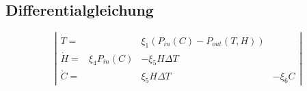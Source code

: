 \begin{refsection}
%
%
%
%
%
%
%
%
%
%

\subsection{Differentialgleichung}

\begin{equation}
\left|
\begin{matrix}
\dot{T} = &  & \xi_1 \left(P_{in}(C) - P_{out}(T, H) \right) &\\
\dot{H} = & \xi_4 P_{in}(C) & - \xi_5 H \Delta T & \\
\dot{C} = &                 &   \xi_5 H \Delta T & - \xi_6 C
\end{matrix}
\right|
\end{equation}


\end{refsection}
